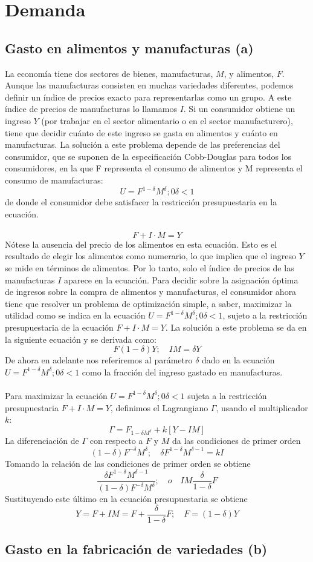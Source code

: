 \section{Demanda}
\subsection{Gasto en alimentos y manufacturas (a)}
La economía tiene dos sectores de bienes, manufacturas, $M$, y alimentos, $F$. Aunque las manufacturas consisten en muchas variedades diferentes, podemos definir un índice de precios exacto para representarlas como un grupo. A este índice de precios de manufacturas lo llamamos $I$. Si un consumidor obtiene un ingreso $Y$ (por trabajar en el sector alimentario o en el sector manufacturero), tiene que decidir cuánto de este ingreso se gasta en alimentos y cuánto en manufacturas. La solución a este problema depende de las preferencias del consumidor, que se suponen de la especificación Cobb-Douglas para todos los consumidores, en la que F representa el consumo de alimentos y M representa el consumo de manufacturas:
$$U=F^{1-\delta}M^\delta; 0\delta<1$$
de donde el consumidor debe satisfacer la restricción presupuestaria en la ecuación.\\\\
$$F+I\cdot M = Y$$
Nótese la ausencia del precio de los alimentos en esta ecuación. Esto es el resultado de elegir los alimentos como numerario, lo que implica que el ingreso $Y$ se mide en términos de alimentos. Por lo tanto, solo el índice de precios de las manufacturas $I$ aparece en la ecuación. Para decidir sobre la asignación óptima de ingresos sobre la compra de alimentos y manufacturas, el consumidor ahora tiene que resolver un problema de optimización simple, a saber, maximizar la utilidad como se indica en la ecuación $U=F^{1-\delta}M^\delta; 0\delta<1$, sujeto a la restricción presupuestaria de la ecuación $F+I\cdot M = Y$. La solución a este problema se da en la siguiente ecuación y se derivada como:
$$F(1-\delta)Y;\quad IM=\delta Y$$
De ahora en adelante nos referiremos al parámetro $\delta$ dado en la ecuación $U=F^{1-\delta}M^\delta; 0\delta<1$ como la fracción del ingreso gastado en manufacturas.\\\\

Para maximizar la ecuación $U=F^{1-\delta}M^\delta; 0\delta<1$ sujeta a la restricción presupuestaria 
$F+I\cdot M = Y$, definimos el Lagrangiano $\Gamma$, usando el multiplicador $k$:
$$\Gamma = F_{1-\delta M^{\delta}}+k[Y-IM]$$
La diferenciación de $\Gamma$ con respecto a $F$ y $M$ da las condiciones de primer orden
$$(1-\delta)F^{-\delta}M^{\delta};\quad \delta F^{1-\delta}M^{\delta-1} = kI$$
Tomando la relación de las condiciones de primer orden se obtiene
$$\dfrac{\delta F^{1-\delta} M^{\delta-1}}{(1-\delta)F^{-\delta} M^{\delta}}; \quad o \quad IM\dfrac{\delta}{1-\delta}F$$
Sustituyendo este último en la ecuación presupuestaria se obtiene
$$Y=F+IM=F+\dfrac{\delta}{1-\delta}F;\quad F=(1-\delta)Y$$

\subsection{Gasto en la fabricación de variedades (b)}
